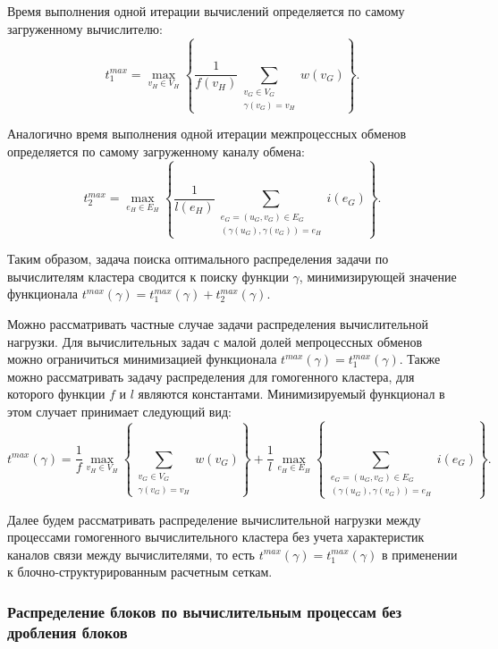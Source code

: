 Время выполнения одной итерации вычислений определяется по самому загруженному вычислителю:
\begin{equation}
	t_1^{max} = \max_{v_H \in V_H}{ \left\{ \frac{1}{f(v_H)} \sum_{\substack{v_G \in V_G \\ \gamma(v_G) = v_H}}{w(v_G)} \right\} }.
\end{equation}

Аналогично время выполнения одной итерации межпроцессных обменов определяется по самому загруженному каналу обмена:
\begin{equation}
	t_2^{max} = \max_{e_H \in E_H}{ \left\{ \frac{1}{l(e_H)} \sum_{\substack{e_G = (u_G, v_G) \in E_G \\ (\gamma(u_G), \gamma(v_G)) = e_H}}{i(e_G)} \right\} }.
\end{equation}

Таким образом, задача поиска оптимального распределения задачи по вычислителям кластера сводится к поиску функции $\gamma$, минимизирующей значение функционала $t^{max}(\gamma) = t_1^{max}(\gamma) + t_2^{max}(\gamma)$.

Можно рассматривать частные случае задачи распределения вычислительной нагрузки.
Для вычислительных задач с малой долей мепроцессных обменов можно ограничиться минимизацией функционала $t^{max}(\gamma) = t_1^{max}(\gamma)$.
Также можно рассматривать задачу распределения для гомогенного кластера, для которого функции $f$ и $l$ являются константами.
Минимизируемый функционал в этом случает принимает следующий вид:
\begin{equation}
	t^{max}(\gamma) =
		\frac{1}{f} \max_{v_H \in V_H}{ \left\{ \sum_{\substack{v_G \in V_G \\ \gamma(v_G) = v_H}}{w(v_G)} \right\} } + 
		\frac{1}{l} \max_{e_H \in E_H}{ \left\{ \sum_{\substack{e_G = (u_G, v_G) \in E_G \\ (\gamma(u_G), \gamma(v_G)) = e_H}}{i(e_G)} \right\} }.
\end{equation}

Далее будем рассматривать распределение вычислительной нагрузки между процессами гомогенного вычислительного кластера без учета характеристик каналов связи между вычислителями, то есть $t^{max}(\gamma) = t_1^{max}(\gamma)$ в применении к блочно-структурированным расчетным сеткам.

\newpage
\subsubsection{Распределение блоков по вычислительным процессам без дробления блоков}

